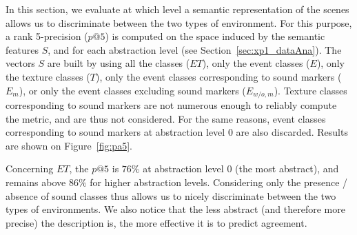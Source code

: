 \documentclass[12pt]{elsarticle}
\newcommand{\ie}{\emph{i.\,e.}}
\newcommand{\cf}{cf.}
\begin{document}
In this section, we evaluate at which level a semantic representation of the scenes allows us to discriminate between the two types of environment. For this purpose, a rank 5-precision ($p@5$) is computed on the space induced by the semantic features $S$, and for each abstraction level (see Section~\ref{sec:xp1_dataAna}). The vectors $S$ are built by using all the classes ($ET$), only the event classes ($E$), only the texture classes ($T$), only the event classes corresponding to sound markers ($E_m$), or only the event classes excluding sound markers ($E_{w/o,m}$). Texture classes corresponding to sound markers are not numerous enough to reliably compute the metric, and are thus not considered. For the same reasons, event classes corresponding to sound markers at abstraction level $0$ are also discarded. Results are shown on Figure~\ref{fig:pa5}.


Concerning $ET$, the $p@5$ is $76\%$ at abstraction level $0$ (the most abstract), and remains above $86\%$ for higher abstraction levels. Considering only the presence / absence of sound classes thus allows us to nicely discriminate between the two types of environments. We also notice that the less abstract (and therefore more precise) the description is, the more effective it is to predict agreement.

\end{document}
